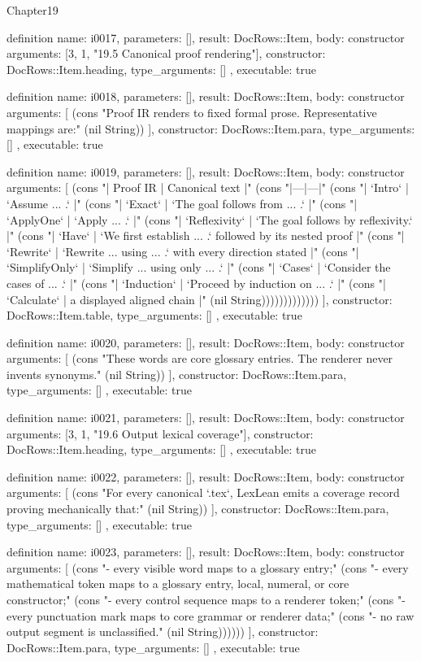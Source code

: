 \begin{lexlean}{Chapter19}
\begin{semanticmodule}
definition{
  name: i0017,
  parameters: [],
  result: DocRows::Item,
  body: constructor{
    arguments: [3, 1, "19.5 Canonical proof rendering"],
    constructor: DocRows::Item.heading,
    type_arguments: []
  },
  executable: true
}

definition{
  name: i0018,
  parameters: [],
  result: DocRows::Item,
  body: constructor{
    arguments: [
      (cons "Proof IR renders to fixed formal prose. Representative mappings are:" (nil String))
    ],
    constructor: DocRows::Item.para,
    type_arguments: []
  },
  executable: true
}

definition{
  name: i0019,
  parameters: [],
  result: DocRows::Item,
  body: constructor{
    arguments: [
      (cons "| Proof IR | Canonical text |" (cons "|---|---|" (cons "| `Intro` | `Assume ... .` |" (cons "| `Exact` | `The goal follows from ... .` |" (cons "| `ApplyOne` | `Apply ... .` |" (cons "| `Reflexivity` | `The goal follows by reflexivity.` |" (cons "| `Have` | `We first establish ... .` followed by its nested proof |" (cons "| `Rewrite` | `Rewrite ... using ... .` with every direction stated |" (cons "| `SimplifyOnly` | `Simplify ... using only ... .` |" (cons "| `Cases` | `Consider the cases of ... .` |" (cons "| `Induction` | `Proceed by induction on ... .` |" (cons "| `Calculate` | a displayed aligned chain |" (nil String)))))))))))))
    ],
    constructor: DocRows::Item.table,
    type_arguments: []
  },
  executable: true
}

definition{
  name: i0020,
  parameters: [],
  result: DocRows::Item,
  body: constructor{
    arguments: [
      (cons "These words are core glossary entries. The renderer never invents synonyms." (nil String))
    ],
    constructor: DocRows::Item.para,
    type_arguments: []
  },
  executable: true
}

definition{
  name: i0021,
  parameters: [],
  result: DocRows::Item,
  body: constructor{
    arguments: [3, 1, "19.6 Output lexical coverage"],
    constructor: DocRows::Item.heading,
    type_arguments: []
  },
  executable: true
}

definition{
  name: i0022,
  parameters: [],
  result: DocRows::Item,
  body: constructor{
    arguments: [
      (cons "For every canonical `.tex`, LexLean emits a coverage record proving mechanically that:" (nil String))
    ],
    constructor: DocRows::Item.para,
    type_arguments: []
  },
  executable: true
}

definition{
  name: i0023,
  parameters: [],
  result: DocRows::Item,
  body: constructor{
    arguments: [
      (cons "- every visible word maps to a glossary entry;" (cons "- every mathematical token maps to a glossary entry, local, numeral, or core constructor;" (cons "- every control sequence maps to a renderer token;" (cons "- every punctuation mark maps to core grammar or renderer data;" (cons "- no raw output segment is unclassified." (nil String))))))
    ],
    constructor: DocRows::Item.para,
    type_arguments: []
  },
  executable: true
}


\end{semanticmodule}
\end{lexlean}
